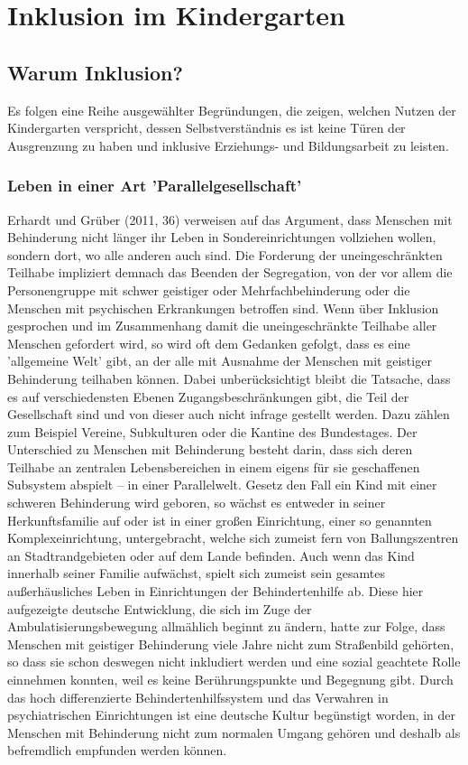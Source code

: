 \chapter{Inklusion im Kindergarten}

\section{Warum Inklusion?}
\label{sec:Why}
Es folgen eine Reihe ausgewählter Begründungen, die zeigen, welchen Nutzen der Kindergarten verspricht, dessen Selbstverständnis es ist keine Türen der Ausgrenzung zu haben und inklusive Erziehungs- und Bildungsarbeit zu leisten. 

\subsection{Leben in einer Art 'Parallelgesellschaft'}
Erhardt und Grüber (2011, 36) verweisen auf das Argument, dass Menschen mit Behinderung nicht länger ihr Leben in Sondereinrichtungen vollziehen wollen, sondern dort, wo alle anderen auch sind. Die Forderung der uneingeschränkten Teilhabe impliziert demnach das Beenden der Segregation, von der vor allem die Personengruppe mit schwer geistiger oder Mehrfachbehinderung oder die Menschen mit psychischen Erkrankungen betroffen sind. Wenn über Inklusion gesprochen und im Zusammenhang damit die uneingeschränkte Teilhabe aller Menschen gefordert wird, so wird oft dem Gedanken gefolgt, dass es eine 'allgemeine Welt' gibt, an der alle mit Ausnahme der Menschen mit geistiger Behinderung teilhaben können. Dabei unberücksichtigt bleibt die Tatsache, dass es auf verschiedensten Ebenen Zugangsbeschränkungen gibt, die Teil der Gesellschaft sind und von dieser auch nicht infrage gestellt werden. Dazu zählen zum Beispiel Vereine, Subkulturen oder die Kantine des Bundestages. Der Unterschied zu Menschen mit Behinderung besteht darin, dass sich deren Teilhabe an zentralen Lebensbereichen in einem eigens für sie geschaffenen Subsystem abspielt -- in einer Parallelwelt.
Gesetz den Fall ein Kind mit einer schweren Behinderung wird geboren, so wächst es entweder in seiner Herkunftsfamilie auf oder ist in einer großen Einrichtung, einer so genannten Komplexeinrichtung, untergebracht, welche sich zumeist fern von Ballungszentren an Stadtrandgebieten oder auf dem Lande befinden. Auch wenn das Kind  innerhalb seiner Familie aufwächst, spielt sich zumeist sein gesamtes außerhäusliches Leben in Einrichtungen der Behindertenhilfe ab. Diese hier aufgezeigte deutsche Entwicklung, die sich im Zuge der Ambulatisierungsbewegung allmählich beginnt zu ändern, hatte zur Folge, dass Menschen mit geistiger Behinderung viele Jahre nicht zum Straßenbild gehörten, so dass sie schon deswegen nicht inkludiert werden und eine sozial geachtete Rolle einnehmen konnten, weil es keine Berührungspunkte und Begegnung gibt. Durch das hoch differenzierte Behindertenhilfssystem und das Verwahren in psychiatrischen Einrichtungen ist eine deutsche Kultur begünstigt worden, in der Menschen mit Behinderung nicht zum normalen Umgang gehören und deshalb als befremdlich empfunden werden können.
